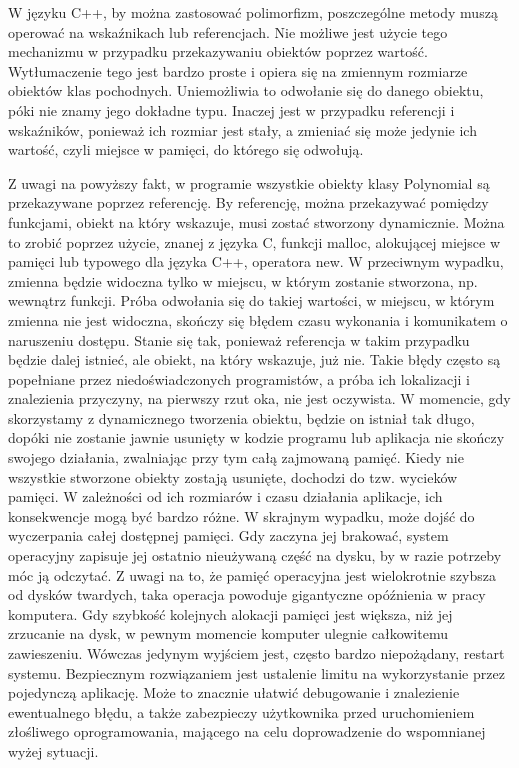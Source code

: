 \documentclass[twoside,a4paper]{book}
\begin{document}
W języku C++, by można zastosować polimorfizm, poszczególne metody muszą operować na wskaźnikach lub referencjach. Nie możliwe jest użycie tego mechanizmu w przypadku przekazywaniu obiektów poprzez wartość. Wytłumaczenie tego jest bardzo proste i opiera się na zmiennym rozmiarze obiektów klas pochodnych. Uniemożliwia to odwołanie się do danego obiektu, póki nie znamy jego dokładne typu. Inaczej jest w przypadku referencji i wskaźników, ponieważ ich rozmiar jest stały, a zmieniać się może jedynie ich wartość, czyli miejsce w pamięci, do którego się odwołują.

Z uwagi na powyższy fakt, w programie wszystkie obiekty klasy Polynomial są przekazywane poprzez referencję. By referencję, można przekazywać pomiędzy funkcjami, obiekt na który wskazuje, musi zostać stworzony dynamicznie. Można to zrobić poprzez użycie, znanej z języka C, funkcji malloc, alokującej miejsce w pamięci lub typowego dla języka C++, operatora new. W przeciwnym wypadku, zmienna będzie widoczna tylko w miejscu, w którym zostanie stworzona, np. wewnątrz funkcji. Próba odwołania się do takiej wartości, w miejscu, w którym zmienna nie jest widoczna, skończy się błędem czasu wykonania i komunikatem o naruszeniu dostępu. Stanie się tak, ponieważ referencja w takim przypadku będzie dalej istnieć, ale obiekt, na który wskazuje, już nie. Takie błędy często są popełniane przez niedoświadczonych programistów, a próba ich lokalizacji i znalezienia przyczyny, na pierwszy rzut oka, nie jest oczywista. W momencie, gdy skorzystamy z dynamicznego tworzenia obiektu, będzie on istniał tak długo, dopóki nie zostanie jawnie usunięty w kodzie programu lub aplikacja nie skończy swojego działania, zwalniając przy tym całą zajmowaną pamięć. Kiedy nie wszystkie stworzone obiekty zostają usunięte, dochodzi do tzw. wycieków pamięci. W zależności od ich rozmiarów i czasu działania aplikacje, ich konsekwencje mogą być bardzo różne. W skrajnym wypadku, może dojść do wyczerpania całej dostępnej pamięci. Gdy zaczyna jej brakować, system operacyjny zapisuje jej ostatnio nieużywaną część na dysku, by w razie potrzeby móc ją odczytać. Z uwagi na to, że pamięć operacyjna jest wielokrotnie szybsza od dysków twardych, taka operacja powoduje gigantyczne opóźnienia w pracy komputera. Gdy szybkość kolejnych alokacji pamięci jest większa, niż jej zrzucanie na dysk, w pewnym momencie komputer ulegnie całkowitemu zawieszeniu. Wówczas jedynym wyjściem jest, często bardzo niepożądany, restart systemu. Bezpiecznym rozwiązaniem jest ustalenie limitu na wykorzystanie przez pojedynczą aplikację. Może to znacznie ułatwić debugowanie i znalezienie ewentualnego błędu, a także zabezpieczy użytkownika przed uruchomieniem złośliwego oprogramowania, mającego na celu doprowadzenie do wspomnianej wyżej sytuacji.
\end{document}
